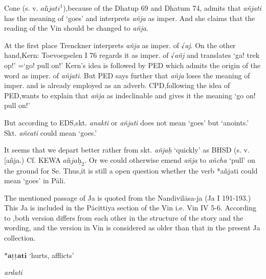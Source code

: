 \documentclass[11pt]{article}
\newcommand*\ṛ{r\symbol{"325}}
\newcommand*\Ṛ{R\symbol{"325}}
\newcommand*\ṝ{r\symbol{"304}\symbol{"325}}
\newcommand*\Ṝ{R\symbol{"304}\symbol{"325}}
\newcommand*\ḷ{l\symbol{"325}}
\newcommand*\ḹ{l\symbol{"304}\symbol{"325}}
\newcommand*\Ḷ{L\symbol{"325}}
\newcommand*\Ḹ{L\symbol{"304}\symbol{"325}}
\begin{document}
Cone (s. v. $\textit{añjati}^1$),because of the Dhatup 69 and Dhatum 74,
admits that \textit{añjati} has the meaning of `goes' and interprets \textit{añja} as imper.
And she claims that the reading of the Vin should be changed to \textit{añja}.

At the first place Trenckner interprets \textit{añja} as imper. of √\textit{aj}.
On the other hand,Kern: Toevoegselen I 76 regards it as imper. of √\textit{añj} and translates `ga! trek op!' =`go! pull on!'
Kern's idea is followed by PED which admits the origin of the word as imper. of \textit{añjati}.
But PED says further that \textit{añja} loses the meaning of imper. and is already employed as an adverb.
CPD,following the idea of PED,wants to explain that \textit{añja} as indeclinable and gives it the meaning `go on! pull on!'

But according to EDS,skt. \textit{anakti} or \textit{añjati} does not mean `goes' but `anoints.'
Skt. \textit{añcati} could mean `goes.'

It seems that we depart better rather from skt. \textit{añjaḥ} `quickly' as BHSD (s. v. [añja.) Cf. KEWA $\textit{añjaḥ}_2$.
Or we could otherwise emend \textit{añja} to \textit{añcha} `pull' on the ground for Se.
Thus,it is still a open question whether the verb {*añjati} could mean `goes' in Pāli.

The mentioned passage of Ja is quoted from the Nandivilāsa-ja (Ja I 191-193.)
This Ja is included in the Pācittiya section of the Vin i.e. Vin IV 5-6.
According to \citet[188-189]{vonhinueber:1998},both version differs from each other in the structure of the story and the wording,
and the version in Vin is considered as older than that in the present Ja collection.

%
%
%
%

%
%
\begin{center}
{\Large
$*\textbf{aṭṭati}$ `hurts, afflicts'
}
\end{center}
\begin{description}[leftmargin=\parindent]
\item[skt.] \textit{ardati}
\end{description}
\end{document}
